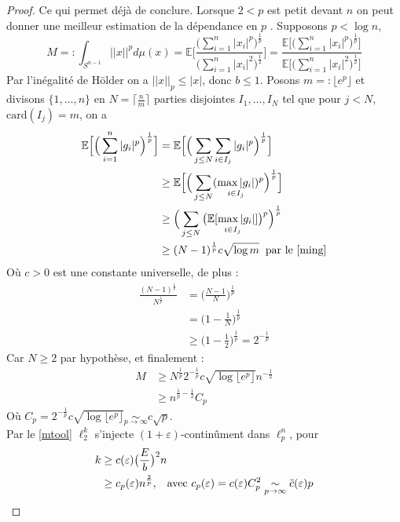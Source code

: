 \documentclass[12pt]{article}
\theoremstyle{definition}
\begin{document}
\begin{proof}
Ce qui permet déjà de conclure. Lorsque $2<p$ est petit devant $n$ on peut donner une meilleur estimation de la dépendance en $p$ . Supposons $p<\log n$,
\begin{equation*}
M =: \int_{S^{n-1}}||x||^p d\mu(x) = \mathbb{E}\Bigg[\frac{\big(\sum_{i=1}^{n}|x_i|^p\big)^{\frac{1}{p}}}{\big(\sum_{i=1}^{n}|x_i|^2\big)^{\frac{1}{2}}}\Bigg]= \frac{\mathbb{E}\Bigg[\big(\sum_{i=1}^{n}|x_i|^p\big)^{\frac{1}{p}}\Bigg]}{\mathbb{E}\Bigg[\big(\sum_{i=1}^{n}|x_i|^2\big)^{\frac{1}{2}}\Bigg]}
\end{equation*}
Par l'inégalité de Hölder on a $||x||_p\leq |x|$, donc $b\leq1$. Posons $m=:\lfloor e^p\rfloor$ et divisons $\{1,...,n\}$ en $N=\lceil\frac{n}{m}\rceil$ parties disjointes $I_1,...,I_N$ tel que pour $j<N$, $\text{card}(I_j)=m$, on a 
\begin{align*}
\mathbb{E}\Big[\Big(\sum_{i=1}^{n}|g_i|^p\Big)^{\frac{1}{p}}\Big]&= \mathbb{E}\Big[\Big(\sum_{j\leq N}\sum_{i\in I_j}|g_i|^p\Big)^{\frac{1}{p}}\Big]\\
&\geq\mathbb{E}\Big[\Big(\sum_{j\leq N}(\underset{i\in I_j}{\max|g_i|})^p\Big)^{\frac{1}{p}}\Big]\\
&\geq \Big(\sum_{j\leq N}\big(\underset{i\in I_j}{\mathbb{E}[\max|g_i|]}\big)^p\Big)^{\frac{1}{p}}\\
&\geq(N-1)^{\frac{1}{p}}c\sqrt{\log m} \hspace{2mm} \text{par le \cref{ming}}
\end{align*}
Où $c>0$ est une constante universelle, de plus :
\begin{align*}
\frac{(N-1)^{\frac{1}{p}}}{N^{\frac{1}{p}}}&=\big(\frac{N-1}{N}\big)^{\frac{1}{p}}\\
&= \big(1-\frac{1}{N}\big)^{\frac{1}{p}}\\
&\geq \big(1-\frac{1}{2}\big)^{\frac{1}{p}}=2^{-\frac{1}{p}}
\end{align*}
\noindent Car $N\geq 2$ par hypothèse, et finalement :
\begin{align*}
M &\geq N^{\frac{1}{p}}2^{-\frac{1}{p}} c\sqrt{\log \lfloor e^p\rfloor} n^{-\frac{1}{2}}\\
& \geq n^{\frac{1}{p}-\frac{1}{2}}C_p
\end{align*}
Où $C_p =2^{-\frac{1}{p}} c\sqrt{\log \lfloor e^p\rfloor}\underset{p\to\infty}{\sim} c\sqrt{p}$.\\
Par le \cref{mtool} $\ell_2^k$ s'injecte $(1+\varepsilon)$-continûment dans $\ell_p^n$, pour
\begin{align*}
k &\geq c(\varepsilon)\big(\frac{E}{b}\big)^2n\\
&\geq c_p(\varepsilon)n^{\frac{2}{p}}, \hspace{3mm} \text{avec $c_p(\varepsilon) = c(\varepsilon)C_p^2\underset{p\to\infty}{\sim} \tilde{c}(\varepsilon)p$}
\end{align*}\end{proof}
\end{document}
